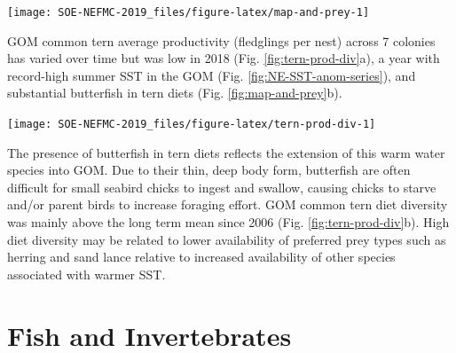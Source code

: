 \documentclass[10pt,]{article}
\let\origfigure\figure
\let\endorigfigure\endfigure
\renewenvironment{figure}[1][2] {
    \expandafter\origfigure\expandafter[H]
} {
    \endorigfigure
}
\begin{document}
\begin{figure}

{\centering \texttt{[image: SOE-NEFMC-2019\_files/figure-latex/map-and-prey-1]} 

}

\caption{Common terns: a. Locations of the seven sampled common tern nesting sites in Gulf of Maine (EER = Eastern Egg Rock, JI = Jenny Island, MR = Matinicus Rock, OGI = Outer Green Island, PINWR = Pond Island National Wildlife Refuge, SINWR = Seal Island National Wildlife Refuge, STI = Stratton Island), and b. Prey frequencies in the diets of common tern observed across the seven colonies in Gulf of Maine. Prey occurring in <5 percent of common tern diets were excluded for clarity.}\label{fig:map-and-prey}
\end{figure}

GOM common tern average productivity (fledglings per nest) across 7
colonies has varied over time but was low in 2018 (Fig.
\ref{fig:tern-prod-div}a), a year with record-high summer SST in the GOM
(Fig. \ref{fig:NE-SST-anom-series}), and substantial butterfish in tern
diets (Fig. \ref{fig:map-and-prey}b).

\begin{figure}

{\centering \texttt{[image: SOE-NEFMC-2019\_files/figure-latex/tern-prod-div-1]} 

}

\caption{a. Mean common tern productivity at nesting sites in Gulf of Maine. Error bars show +/- 1 SE of the mean. b. Shannon diversity of common tern diets observed at nesting sites in Gulf of Maine. Diversity of common tern diets has been predominantly above the long-term mean since 2006.}\label{fig:tern-prod-div}
\end{figure}

The presence of butterfish in tern diets reflects the extension of this
warm water species into GOM. Due to their thin, deep body form,
butterfish are often difficult for small seabird chicks to ingest and
swallow, causing chicks to starve and/or parent birds to increase
foraging effort. GOM common tern diet diversity was mainly above the
long term mean since 2006 (Fig. \ref{fig:tern-prod-div}b). High diet
diversity may be related to lower availability of preferred prey types
such as herring and sand lance relative to increased availability of
other species associated with warmer SST.

\newpage

\section{Fish and Invertebrates}\label{fish-and-invertebrates}
\end{document}
